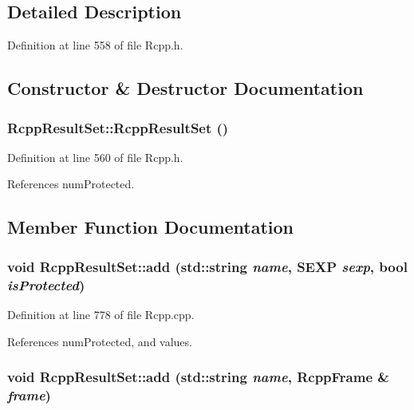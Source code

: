 \subsection{Detailed Description}


Definition at line 558 of file Rcpp.h.

\subsection{Constructor \& Destructor Documentation}
\hypertarget{classRcppResultSet_b799c6b9bd730e55d92228203903ba74}{
\subsubsection[{RcppResultSet}]{\setlength{\rightskip}{0pt plus 5cm}RcppResultSet::RcppResultSet ()}}
\label{classRcppResultSet_b799c6b9bd730e55d92228203903ba74}




Definition at line 560 of file Rcpp.h.

References numProtected.

\subsection{Member Function Documentation}
\hypertarget{classRcppResultSet_5f44a63a2cab43db551c0e27d6fec378}{
\subsubsection[{add}]{\setlength{\rightskip}{0pt plus 5cm}void RcppResultSet::add (std::string {\em name}, \/  SEXP {\em sexp}, \/  bool {\em isProtected})}}
\label{classRcppResultSet_5f44a63a2cab43db551c0e27d6fec378}




Definition at line 778 of file Rcpp.cpp.

References numProtected, and values.\hypertarget{classRcppResultSet_9e05fb2ca92258529ffbb536e23a2a4d}{
\subsubsection[{add}]{\setlength{\rightskip}{0pt plus 5cm}void RcppResultSet::add (std::string {\em name}, \/  {\bf RcppFrame} \& {\em frame})}}
\label{classRcppResultSet_9e05fb2ca92258529ffbb536e23a2a4d}




